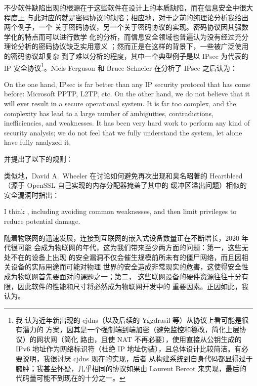 不少软件缺陷出现的根源在于这些软件在设计上的本质缺陷，而在信息安全中很大程度上
与此对应的就是密码协议的缺陷；相应地，对于之前的纯理论分析我给出两个例子，一个
关于密码协议，另一个关于密码协议的实现。密码协议因其强数学化的特点而可以进行数学
化的分析，而信息安全领域也普遍认为没有经过充分理论分析的密码协议缺乏实用意义%
；然而正是在这样的背景下，一些被广泛使用的密码协议却复杂
到了难以分析的程度，其中一个典型例子是以 IPsec 为代表的 IP 安全协议\footnote{我
认为近年新出现的 cjdns（以及后续的 Yggdrasil 等）从协议上看可能是很有潜力的
方案，因其是一个强制端到端加密（避免监控和篡改，简化上层协议）的网状网（简化
路由，且使 NAT 不再必要），使用直接从公钥生成的 IPv6 地址作为网络标识符（杜绝
IP 地址伪装），且总体设计比较简洁。有必要说明，我很讨厌 cjdns 现在的实现，后者
从构建系统到自身代码都显得过于臃肿；我甚至怀疑，几乎相同的协议如果由 Laurent
Bercot 来实现，最后的代码量可能不到现在的十分之一。}。Niels Ferguson 和
Bruce Schneier 在分析了 IPsec 之后认为：
\begin{quoting}
	On the one hand, IPsec is far better than any IP security protocol that has
	come before: Microsoft PPTP, L2TP, etc.  On the other hand, we do not
	believe that it will ever result in a secure operational system.  It is far
	too complex, and the complexity has lead to a large number of ambiguities,
	contradictions, inefficiencies, and weaknesses.  It has been very hard work
	to perform any kind of security analysis; we do not feel that we fully
	understand the system, let alone have fully analyzed it.
\end{quoting}
并提出了以下的规则：
\begin{quoting}
\end{quoting}
类似地，David A.\ Wheeler 在讨论如何避免再次出现和臭名昭著的
Heartbleed（源于 OpenSSL 自己实现的内存分配器掩盖了其中的
缓冲区溢出问题）相似的安全漏洞时指出：
\begin{quoting}
	I think , including avoiding
	common weaknesses, and then limit privileges to reduce potential damage.
\end{quoting}

随着物联网的迅速发展，连接到互联网的嵌入式设备数量正在不断增长，2020 年代很可能
会成为物联网的年代，这为我们带来至少两方面的问题：第一，这些无处不在的设备上出现
的安全漏洞不仅会催生规模前所未有的僵尸网络，而且因相关设备的实际用途而可能对物理
世界的安全造成非常现实的危害，这使得安全性成为物联网首先要面对的课题之一；第二，
这些联网设备的硬件资源往往十分有限，因此软件的性能和尺寸将必然成为物联网开发中的
重要因素。正因如此，我认为。

